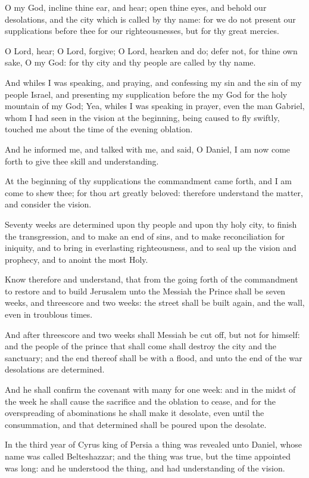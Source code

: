 \Verse O my God, incline thine ear, and hear; open thine eyes, and behold our desolations, and the city which is called by thy name: for we do not present our supplications before thee for our righteousnesses, but for thy great mercies.

\Verse O Lord, hear; O Lord, forgive; O Lord, hearken and do; defer not, for thine own sake, O my God: for thy city and thy people are called by thy name.

\Verse And whiles I was speaking, and praying, and confessing my sin and the sin of my people Israel, and presenting my supplication before the \LORD my God for the holy mountain of my God; \Verse Yea, whiles I was speaking in prayer, even the man Gabriel, whom I had seen in the vision at the beginning, being caused to fly swiftly, touched me about the time of the evening oblation.

\Verse And he informed me, and talked with me, and said, O Daniel, I am now come forth to give thee skill and understanding.

\Verse At the beginning of thy supplications the commandment came forth, and I am come to shew thee; for thou art greatly beloved: therefore understand the matter, and consider the vision.

\Verse Seventy weeks are determined upon thy people and upon thy holy city, to finish the transgression, and to make an end of sins, and to make reconciliation for iniquity, and to bring in everlasting righteousness, and to seal up the vision and prophecy, and to anoint the most Holy.

\Verse Know therefore and understand, that from the going forth of the commandment to restore and to build Jerusalem unto the Messiah the Prince shall be seven weeks, and threescore and two weeks: the street shall be built again, and the wall, even in troublous times.

\Verse And after threescore and two weeks shall Messiah be cut off, but not for himself: and the people of the prince that shall come shall destroy the city and the sanctuary; and the end thereof shall be with a flood, and unto the end of the war desolations are determined.

\Verse And he shall confirm the covenant with many for one week: and in the midst of the week he shall cause the sacrifice and the oblation to cease, and for the overspreading of abominations he shall make it desolate, even until the consummation, and that determined shall be poured upon the desolate.


\Chapter
\Verse In the third year of Cyrus king of Persia a thing was revealed unto Daniel, whose name was called Belteshazzar; and the thing was true, but the time appointed was long: and he understood the thing, and had understanding of the vision.

